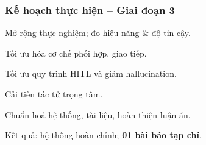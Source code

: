 \begin{frame}
    \frametitle{Kế hoạch thực hiện – Giai đoạn 3}
    \begin{BulletTight}
        \item Mở rộng thực nghiệm; đo hiệu năng \& độ tin cậy.
        \item Tối ưu hóa cơ chế phối hợp, giao tiếp.
        \item Tối ưu quy trình HITL và giảm hallucination.
        \item Cải tiến tác tử trọng tâm.
        \item Chuẩn hoá hệ thống, tài liệu, hoàn thiện luận án.
        \item[\raise0.2ex\hbox{\color{KHTN_BLUE!85}\scriptsize\faArrowRight}]
        Kết quả: hệ thống hoàn chỉnh; \textbf{01 bài báo tạp chí}.
    \end{BulletTight}
\end{frame}